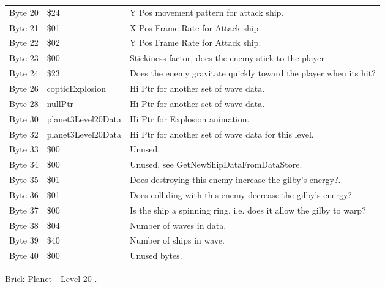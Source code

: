 \begin{figure}[H]
{\begin{adjustbox}{width=12cm}
\begin{tabular}{lll}
 Byte 20 & \$24                & Y Pos movement pattern for attack ship.                            \\
 Byte 21 & \$01                & X Pos Frame Rate for Attack ship.                                  \\
 Byte 22 & \$02                & Y Pos Frame Rate for Attack ship.                                  \\
 Byte 23 & \$00                & Stickiness factor, does the enemy stick to the player              \\
 Byte 24 & \$23                & Does the enemy gravitate quickly toward the player when its hit?   \\
 Byte 26 & copticExplosion    & Hi Ptr for another set of wave data.                               \\
 Byte 28 & nullPtr            & Hi Ptr for another set of wave data.                               \\
 Byte 30 & planet3Level20Data & Hi Ptr for Explosion animation.                                    \\
 Byte 32 & planet3Level20Data & Hi Ptr for another set of wave data for this level.                \\
 Byte 33 & \$00                & Unused.                                                            \\
 Byte 34 & \$00                & Unused, see GetNewShipDataFromDataStore.                           \\
 Byte 35 & \$01                & Does destroying this enemy increase the gilby's energy?.           \\
 Byte 36 & \$01                & Does colliding with this enemy decrease the gilby's energy?        \\
 Byte 37 & \$00                & Is the ship a spinning ring, i.e. does it allow the gilby to warp? \\
 Byte 38 & \$04                & Number of waves in data.                                           \\
 Byte 39 & \$40                & Number of ships in wave.                                           \\
 Byte 40 & \$00                & Unused bytes.                                                      \\
\bottomrule
\end{tabular}

  \end{adjustbox}

  }\caption*{Brick Planet - Level 20
.}
\end{figure}

